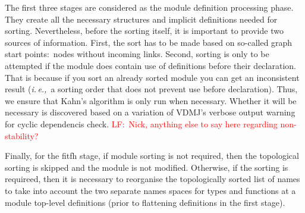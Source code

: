 \documentclass[runningheads,a4paper]{llncs}
\newcommand{\ie}{{\em i.\,e.,\/}}
\newcommand{\lfcomment}[1]{{\scriptsize\textcolor{red}{LF:~#1}}}
\begin{document}
The first three stages are considered as the module definition processing phase. They create all the necessary structures and implicit definitions needed for sorting. Nevertheless, before the sorting itself, it is important to provide two sources of information. First, the sort has to be made based on so-called graph start points:~nodes without incoming links. Second, sorting is only to be attempted if the module does contain use of definitions before their declaration. That is because if you sort an already sorted module you can get an inconsistent result (\ie~a sorting order that does not prevent use before declaration). Thus, we ensure that Kahn's algorithm is only run when necessary. Whether it will be necessary is discovered based on a variation of VDMJ's verbose output warning for cyclic dependencis check. \lfcomment{Nick, anything else to say here regarding non-stability?}    

Finally, for the fitfh stage, if module sorting is not required, then the topological sorting is skipped and the module is not modified. Otherwise, if the sorting is requireed, then it is necessary to reorganise the topologically sorted list of names to take into account the two separate names spaces for types and functions at a module top-level definitions (prior to flattening definitions in the first stage). 
\end{document}
